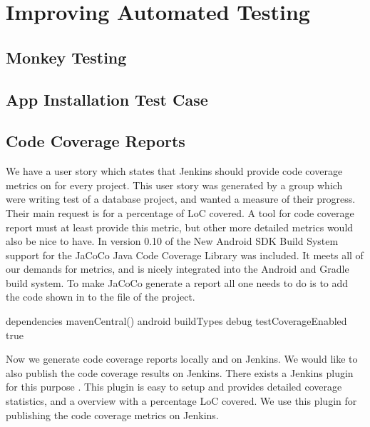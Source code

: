 \chapter{Improving Automated Testing}
\dummy

\section{Monkey Testing}
\dummy

\section{App Installation Test Case}
\dummy

\section{Code Coverage Reports}
We have a user story which states that Jenkins should provide code coverage metrics on for every project. This user story was generated by a group which were writing test of a database project, and wanted a measure of their progress. Their main request is for a percentage of LoC covered. A tool for code coverage report must at least provide this metric, but other more detailed metrics would also be nice to have. In version 0.10 of the New Android SDK Build System \parencite{new-build-android} support for the JaCoCo \parencite{jacoco-home} Java Code Coverage Library was included. It meets all of our demands for metrics, and is nicely integrated into the Android and Gradle build system. 
To make JaCoCo generate a report all one needs to do is to add the code shown in  to the  file of the project. 
\begin{gradlecode}[caption=Gradle script for enabling JaCoCo,label=lst:Jacoco]
dependencies {
    mavenCentral()
}
android {
    buildTypes {
        debug {
            testCoverageEnabled true
        }
    }
}
\end{gradlecode}{}
Now we generate code coverage reports locally and on Jenkins. We would like to also publish the code coverage results on Jenkins. There exists a Jenkins plugin for this purpose \parencite{jacoco-jenkins-plugin}. This plugin is easy to setup and provides detailed coverage statistics, and a overview with a percentage LoC covered. We use this plugin for publishing the code coverage metrics on Jenkins.